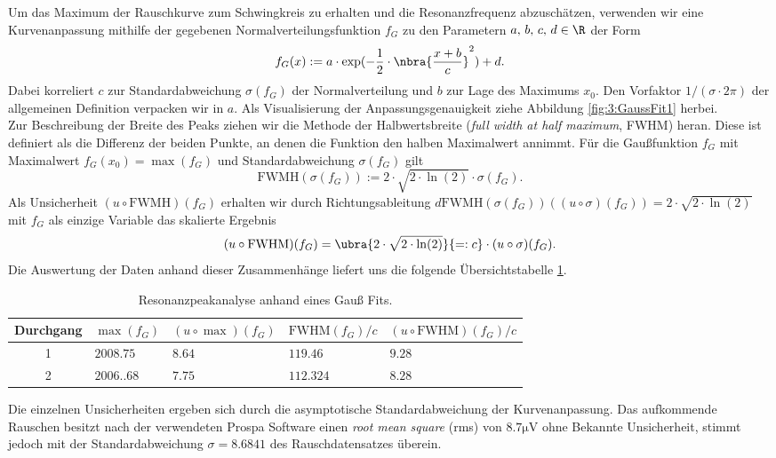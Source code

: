 \documentclass{article}
\begin{document}
    Um das Maximum der Rauschkurve zum Schwingkreis zu erhalten und die Resonanzfrequenz abzuschätzen, verwenden wir eine Kurvenanpassung mithilfe der gegebenen Normalverteilungsfunktion $f_G$ zu den Parametern $a,\, b,\, c,\, d\in\R$ der Form
    \[
        f_G(x) := a\cdot\exp(-\frac{1}{2}\cdot\nbra{\frac{x + b}{c}}^2) + d.
    \]
    Dabei korreliert $c$ zur Standardabweichung $\sigma(f_G)$ der Normalverteilung und $b$ zur Lage des Maximums $x_0$. Den Vorfaktor $1/(\sigma\cdot 2\pi)$ der allgemeinen Definition verpacken wir in $a$. Als Visualisierung der Anpassungsgenauigkeit ziehe Abbildung \ref{fig:3:GaussFit1} herbei. \\
    Zur Beschreibung der Breite des Peaks ziehen wir die Methode der Halbwertsbreite (\emph{full width at half maximum}, FWHM) heran. Diese ist definiert als die Differenz der beiden Punkte, an denen die Funktion den halben Maximalwert annimmt. Für die Gaußfunktion $f_G$ mit Maximalwert $f_G(x_0) = \max(f_G)$ und Standardabweichung $\sigma(f_G)$ gilt
    \[
        \text{FWMH}(\sigma(f_G)) := 2\cdot\sqrt{2\cdot\ln(2)}\cdot\sigma(f_G).
    \]
    Als Unsicherheit $(u\circ\text{FWMH})(f_G)$ erhalten wir durch Richtungsableitung $d\text{FWMH}(\sigma(f_G))((u\circ\sigma)(f_G)) = 2\cdot\sqrt{2\cdot\ln(2)}$ mit $f_G$ als einzige Variable das skalierte Ergebnis \cite[wiki]{enwiki:FWHM}
    \[
        (u\circ\text{FWHM})(f_G) = \ubra{2\cdot\sqrt{2\cdot\ln(2)}}{=:c}\cdot (u\circ\sigma)(f_G).
    \] 
    Die Auswertung der Daten anhand dieser Zusammenhänge liefert uns die folgende Übersichtstabelle \ref{tab:3:PeakInfo}.
    \begin{table}[h]
       \centering
       \begin{tabular}{c|ll|ll}
            \textbf{Durchgang} & $\max(f_G)$ & $(u\circ\max)(f_G)$ & $\text{FWHM}(f_G)/c$ & $(u\circ\text{FWHM})(f_G)/c$ \\
            \hline
            1 & $2008.75$ & $8.64$ & $119.46$ & $9.28$ \\
            2 & $2006..68$ & $7.75$ & $112.324$ & $8.28$
        \end{tabular} 
        \caption{Resonanzpeakanalyse anhand eines Gauß Fits.}
        \label{tab:3:PeakInfo}
    \end{table}
    Die einzelnen Unsicherheiten ergeben sich durch die asymptotische Standardabweichung der Kurvenanpassung. Das aufkommende Rauschen besitzt nach der verwendeten Prospa Software einen \emph{root mean square} (rms) von $8.7\si{\micro\volt}$ ohne Bekannte Unsicherheit, stimmt jedoch mit der Standardabweichung $\sigma = 8.6841$ des Rauschdatensatzes überein. \\
\end{document}
